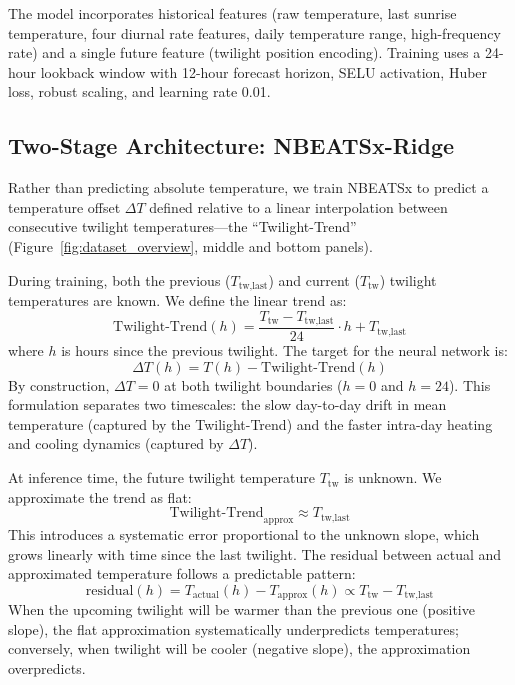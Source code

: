 \documentclass[twocolumn]{aastex631}
\begin{document}
The model incorporates historical features (raw temperature, last sunrise temperature, four diurnal rate features, daily temperature range, high-frequency rate) and a single future feature (twilight position encoding). Training uses a 24-hour lookback window with 12-hour forecast horizon, SELU activation, Huber loss, robust scaling, and learning rate 0.01.

\subsection{Two-Stage Architecture: NBEATSx-Ridge}

Rather than predicting absolute temperature, we train NBEATSx to predict a temperature offset $\Delta T$ defined relative to a linear interpolation between consecutive twilight temperatures---the ``Twilight-Trend'' (Figure~\ref{fig:dataset_overview}, middle and bottom panels).

During training, both the previous ($T_{\text{tw,last}}$) and current ($T_{\text{tw}}$) twilight temperatures are known. We define the linear trend as:
\begin{equation}
\text{Twilight-Trend}(h) = \frac{T_{\text{tw}} - T_{\text{tw,last}}}{24} \cdot h + T_{\text{tw,last}}
\end{equation}
where $h$ is hours since the previous twilight. The target for the neural network is:
\begin{equation}
\Delta T(h) = T(h) - \text{Twilight-Trend}(h)
\end{equation}
By construction, $\Delta T = 0$ at both twilight boundaries ($h=0$ and $h=24$). This formulation separates two timescales: the slow day-to-day drift in mean temperature (captured by the Twilight-Trend) and the faster intra-day heating and cooling dynamics (captured by $\Delta T$).

At inference time, the future twilight temperature $T_{\text{tw}}$ is unknown. We approximate the trend as flat:
\begin{equation}
\text{Twilight-Trend}_{\text{approx}} \approx T_{\text{tw,last}}
\end{equation}
This introduces a systematic error proportional to the unknown slope, which grows linearly with time since the last twilight. The residual between actual and approximated temperature follows a predictable pattern:
\begin{equation}
\text{residual}(h) = T_{\text{actual}}(h) - T_{\text{approx}}(h) \propto T_{\text{tw}} - T_{\text{tw,last}}
\end{equation}
When the upcoming twilight will be warmer than the previous one (positive slope), the flat approximation systematically underpredicts temperatures; conversely, when twilight will be cooler (negative slope), the approximation overpredicts.
\end{document}

